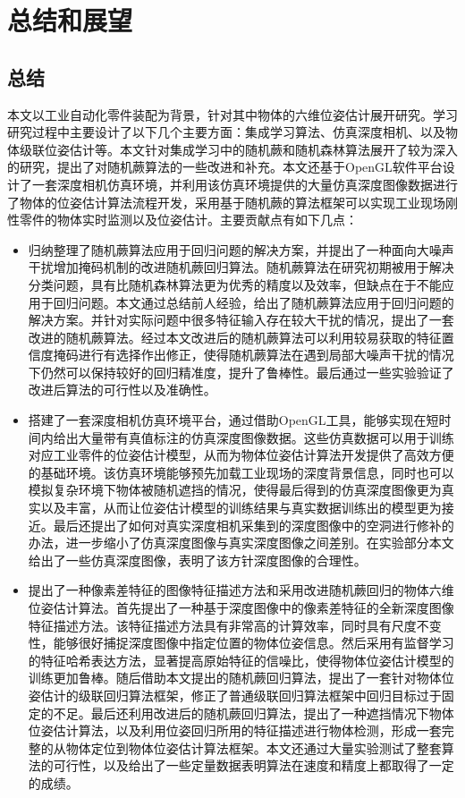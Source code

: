 \chapter{总结和展望}
\section{总结}

本文以工业自动化零件装配为背景，针对其中物体的六维位姿估计展开研究。学习研究过程中主要设计了以下几个主要方面：集成学习算法、仿真深度相机、以及物体级联位姿估计等。本文针对集成学习中的随机蕨和随机森林算法展开了较为深入的研究，提出了对随机蕨算法的一些改进和补充。本文还基于OpenGL软件平台设计了一套深度相机仿真环境，并利用该仿真环境提供的大量仿真深度图像数据进行了物体的位姿估计算法流程开发，采用基于随机蕨的算法框架可以实现工业现场刚性零件的物体实时监测以及位姿估计。主要贡献点有如下几点：

\begin{itemize}
\item 归纳整理了随机蕨算法应用于回归问题的解决方案，并提出了一种面向大噪声干扰增加掩码机制的改进随机蕨回归算法。随机蕨算法在研究初期被用于解决分类问题，具有比随机森林算法更为优秀的精度以及效率，但缺点在于不能应用于回归问题。本文通过总结前人经验，给出了随机蕨算法应用于回归问题的解决方案。并针对实际问题中很多特征输入存在较大干扰的情况，提出了一套改进的随机蕨算法。经过本文改进后的随机蕨算法可以利用较易获取的特征置信度掩码进行有选择作出修正，使得随机蕨算法在遇到局部大噪声干扰的情况下仍然可以保持较好的回归精准度，提升了鲁棒性。最后通过一些实验验证了改进后算法的可行性以及准确性。

\item 搭建了一套深度相机仿真环境平台，通过借助OpenGL工具，能够实现在短时间内给出大量带有真值标注的仿真深度图像数据。这些仿真数据可以用于训练对应工业零件的位姿估计模型，从而为物体位姿估计算法开发提供了高效方便的基础环境。该仿真环境能够预先加载工业现场的深度背景信息，同时也可以模拟复杂环境下物体被随机遮挡的情况，使得最后得到的仿真深度图像更为真实以及丰富，从而让位姿估计模型的训练结果与真实数据训练出的模型更为接近。最后还提出了如何对真实深度相机采集到的深度图像中的空洞进行修补的办法，进一步缩小了仿真深度图像与真实深度图像之间差别。在实验部分本文给出了一些仿真深度图像，表明了该方针深度图像的合理性。

\item 提出了一种像素差特征的图像特征描述方法和采用改进随机蕨回归的物体六维位姿估计算法。首先提出了一种基于深度图像中的像素差特征的全新深度图像特征描述方法。该特征描述方法具有非常高的计算效率，同时具有尺度不变性，能够很好捕捉深度图像中指定位置的物体位姿信息。然后采用有监督学习的特征哈希表达方法，显著提高原始特征的信噪比，使得物体位姿估计模型的训练更加鲁棒。随后借助本文提出的随机蕨回归算法，提出了一套针对物体位姿估计的级联回归算法框架，修正了普通级联回归算法框架中回归目标过于固定的不足。最后还利用改进后的随机蕨回归算法，提出了一种遮挡情况下物体位姿估计算法，以及利用位姿回归所用的特征描述进行物体检测，形成一套完整的从物体定位到物体位姿估计算法框架。本文还通过大量实验测试了整套算法的可行性，以及给出了一些定量数据表明算法在速度和精度上都取得了一定的成绩。
\end{itemize}


